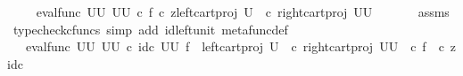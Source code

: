 \begin{isabellebody}
\ \isamarkupfalse%
\ {\isachardoublequoteopen}{\isachardot}{\kern0pt}{\isachardot}{\kern0pt}{\isachardot}{\kern0pt}\ {\isacharequal}{\kern0pt}\ {\isacharparenleft}{\kern0pt}eval{\isacharunderscore}{\kern0pt}func\ {\isacharparenleft}{\kern0pt}U\isactrlbsup U\isactrlesup {\isacharparenright}{\kern0pt}\ {\isacharparenleft}{\kern0pt}U\isactrlbsup U\isactrlesup {\isacharparenright}{\kern0pt}{\isacharparenright}{\kern0pt}\ {\isasymcirc}\isactrlsub c\ {\isasymlangle}f\ {\isasymcirc}\isactrlsub c\ z{\isacharcomma}{\kern0pt}{\isacharparenleft}{\kern0pt}{\isacharparenleft}{\kern0pt}left{\isacharunderscore}{\kern0pt}cart{\isacharunderscore}{\kern0pt}proj\ {\isacharparenleft}{\kern0pt}U{\isacharparenright}{\kern0pt}\ {\isasymone}{\isacharparenright}{\kern0pt}\isactrlsup {\isasymsharp}\ {\isasymcirc}\isactrlsub c\ {\isacharparenleft}{\kern0pt}right{\isacharunderscore}{\kern0pt}cart{\isacharunderscore}{\kern0pt}proj\ {\isacharparenleft}{\kern0pt}U\isactrlbsup U\isactrlesup {\isacharparenright}{\kern0pt}\ {\isasymone}{\isacharparenright}{\kern0pt}{\isacharparenright}{\kern0pt}\isactrlsup {\isasymsharp}{\isasymrangle}{\isachardoublequoteclose}\isanewline
\ \ \ \ \isamarkupfalse%
\ assms\ \isamarkupfalse%
\ {\isacharparenleft}{\kern0pt}typecheck{\isacharunderscore}{\kern0pt}cfuncs{\isacharcomma}{\kern0pt}\ simp\ add{\isacharcolon}{\kern0pt}\ id{\isacharunderscore}{\kern0pt}left{\isacharunderscore}{\kern0pt}unit{}\ metafunc{\isacharunderscore}{\kern0pt}def{}{\isacharparenright}{\kern0pt}\isanewline
\ \ \isamarkupfalse%
\ \isamarkupfalse%
\ {\isachardoublequoteopen}{\isachardot}{\kern0pt}{\isachardot}{\kern0pt}{\isachardot}{\kern0pt}\ {\isacharequal}{\kern0pt}\ {\isacharparenleft}{\kern0pt}eval{\isacharunderscore}{\kern0pt}func\ {\isacharparenleft}{\kern0pt}U\isactrlbsup U\isactrlesup {\isacharparenright}{\kern0pt}\ {\isacharparenleft}{\kern0pt}U\isactrlbsup U\isactrlesup {\isacharparenright}{\kern0pt}{\isacharparenright}{\kern0pt}\ {\isasymcirc}\isactrlsub c\ {\isacharparenleft}{\kern0pt}id\isactrlsub c\ {\isacharparenleft}{\kern0pt}U\isactrlbsup U\isactrlesup {\isacharparenright}{\kern0pt}\ {\isasymtimes}\isactrlsub f\ \ {\isacharparenleft}{\kern0pt}{\isacharparenleft}{\kern0pt}left{\isacharunderscore}{\kern0pt}cart{\isacharunderscore}{\kern0pt}proj\ {\isacharparenleft}{\kern0pt}U{\isacharparenright}{\kern0pt}\ {\isasymone}{\isacharparenright}{\kern0pt}\isactrlsup {\isasymsharp}\ {\isasymcirc}\isactrlsub c\ {\isacharparenleft}{\kern0pt}right{\isacharunderscore}{\kern0pt}cart{\isacharunderscore}{\kern0pt}proj\ {\isacharparenleft}{\kern0pt}U\isactrlbsup U\isactrlesup {\isacharparenright}{\kern0pt}\ {\isasymone}{\isacharparenright}{\kern0pt}{\isacharparenright}{\kern0pt}\isactrlsup {\isasymsharp}{\isacharparenright}{\kern0pt}\ {\isasymcirc}\isactrlsub c\ {\isasymlangle}f\ \ {\isasymcirc}\isactrlsub c\ z{\isacharcomma}{\kern0pt}id\isactrlsub c\ {\isasymone}{\isasymrangle}{\isachardoublequoteclose}\isanewline

\end{isabellebody}
